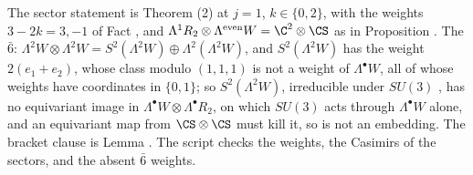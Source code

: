 The sector statement is Theorem (2) at $j = 1$, $k \in \{0, 2\}$, with the weights $3 - 2k = 3, -1$ of Fact , and $\Lambda^{1}R_{2} \otimes \Lambda^{\mathrm{even}}W = \C^{2} \otimes \CS$ as in Proposition . The $\bar{6}$: $\Lambda^{2}W \otimes \Lambda^{2}W = S^{2}(\Lambda^{2}W) \oplus \Lambda^{2}(\Lambda^{2}W)$, and $S^{2}(\Lambda^{2}W)$ has the weight $2(e_{1} + e_{2})$, whose class modulo $(1,1,1)$ is not a weight of $\Lambda^{\bullet}W$, all of whose weights have coordinates in $\{0, 1\}$; so $S^{2}(\Lambda^{2}W)$, irreducible under $SU(3)$ \cite[\S 15.3]{FultonHarris1991}, has no equivariant image in $\Lambda^{\bullet}W \otimes \Lambda^{\bullet}R_{2}$, on which $SU(3)$ acts through $\Lambda^{\bullet}W$ alone, and an equivariant map from $\CS \otimes \CS$ must kill it, so is not an embedding. The bracket clause is Lemma . The script checks the weights, the Casimirs of the sectors, and the absent $\bar{6}$ weights.
